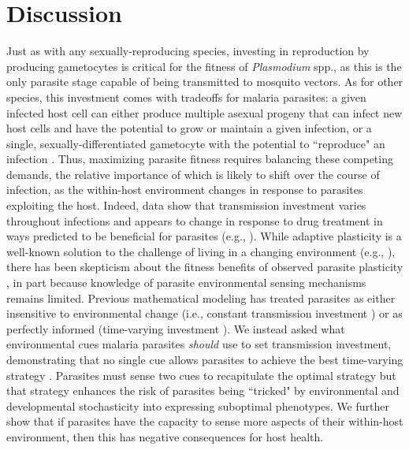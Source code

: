 \documentclass[10pt,letterpaper]{article}
\begin{document}
\section*{Discussion}
Just as with any sexually-reproducing species, investing in reproduction by producing gametocytes is critical for the fitness of \emph{Plasmodium} spp., as this is the only parasite stage capable of being transmitted to mosquito vectors. As for other species, this investment comes with tradeoffs for malaria parasites: a given infected host cell can either produce multiple asexual progeny that can infect new host cells and have the potential to grow or maintain a given infection, or a single, sexually-differentiated gametocyte with the potential to ``reproduce" an infection \cite{schneider_private_2021}. Thus, maximizing parasite fitness requires balancing these competing demands, the relative importance of which is likely to shift over the course of infection, as the within-host environment changes in response to parasites exploiting the host. Indeed, data show that transmission investment varies throughout infections \cite{eichner_genesis_2001,pollitt_competition_2011,cameron_plasticity_2013} and appears to change in response to drug treatment in ways predicted to be beneficial for parasites (e.g., \cite{birget_altered_2018,schneider_adaptive_2018}). While adaptive plasticity is a well-known solution to the challenge of living in a changing environment (e.g., \cite{pigliucci_evolution_2005}), there has been skepticism about the fitness benefits of observed parasite plasticity \cite{kochin_parasite_2010}, in part because knowledge of parasite environmental sensing mechanisms remains limited. Previous mathematical modeling has treated parasites as either insensitive to environmental change (i.e., constant transmission investment \cite{koella_optimal_1995,mckenzie_optimal_1998,mckenzie_integrated_2005, mideo_evolution_2008,bousema_epidemiology_2011, cao_modeling_2019,greischar_partitioning_2019, early_declines_2022}) or as perfectly informed (time-varying investment \cite{koella_optimal_1995, greischar_predicting_2016,birget_phenotypic_2017}). We instead asked what environmental cues malaria parasites \textit{should} use to set transmission investment, demonstrating that no single cue allows parasites to achieve the best time-varying strategy \cite{greischar_predicting_2016}. Parasites must sense two cues to recapitulate the optimal strategy but that strategy enhances the risk of parasites being ``tricked" by environmental and developmental stochasticity into expressing suboptimal phenotypes. We further show that if parasites have the capacity to sense more aspects of their within-host environment, then this has negative consequences for host health.\newline
\end{document}
